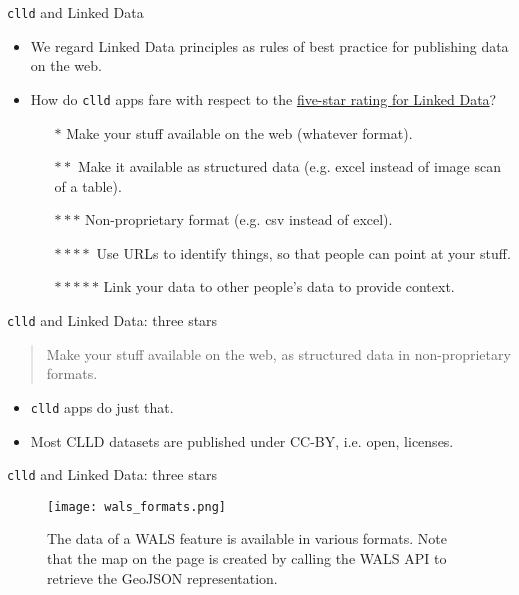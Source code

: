 \documentclass{beamer}
\begin{document}
\begin{frame}{\texttt{clld} and Linked Data}
\begin{itemize}
\item We regard Linked Data principles as rules of best practice for publishing data on the web.
\item How do \texttt{clld} apps fare with respect to the
\href{http://inkdroid.org/journal/2010/06/04/the-5-stars-of-open-linked-data/}{five-star rating for Linked Data}?
\begin{itemize}
\item[$*$] Make your stuff available on the web (whatever format).
\item[$**$] Make it available as structured data (e.g. excel instead of image scan of a table).
\item[$***$] Non-proprietary format (e.g. csv instead of excel).
\item[$****$] Use URLs to identify things, so that people can point at your stuff.
\item[$*****$] Link your data to other people’s data to provide context.
\end{itemize}
\end{itemize}
\end{frame}


\begin{frame}{\texttt{clld} and Linked Data: three stars}
\begin{quote}
Make your stuff available on the web, as structured data in non-proprietary formats.
\end{quote}
\begin{itemize}
\item \texttt{clld} apps do just that.
\item Most CLLD datasets are published under CC-BY, i.e. open, licenses.
\end{itemize}
\end{frame}


\begin{frame}{\texttt{clld} and Linked Data: three stars}
\begin{figure}
\texttt{[image: wals\_formats.png]}
\caption{\label{fig:wals}The data of a WALS feature is available in various formats.
Note that the map on the page is created by calling the WALS API to retrieve the GeoJSON representation.}
\end{figure}
\end{frame}
\end{document}
